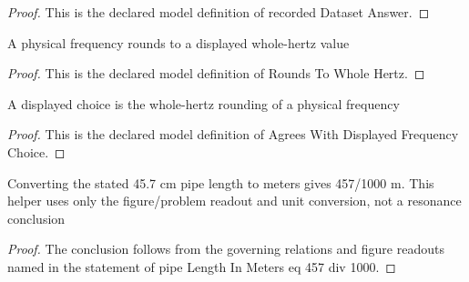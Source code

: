 \begin{proof}
  This is the declared model definition of recorded Dataset Answer.
\end{proof}
\begin{definition}
  \label{def:physics:phyx-mini-0318:phyxminiproblems-problemphyxmini0318-roundstowholehertz}
  A physical frequency rounds to a displayed whole-hertz value
\end{definition}
\begin{proof}
  This is the declared model definition of Rounds To Whole Hertz.
\end{proof}
\begin{definition}
  \label{def:physics:phyx-mini-0318:phyxminiproblems-problemphyxmini0318-agreeswithdisplayedfrequencychoice}
  A displayed choice is the whole-hertz rounding of a physical frequency
\end{definition}
\begin{proof}
  This is the declared model definition of Agrees With Displayed Frequency Choice.
\end{proof}
\begin{lemma}
  \label{lem:physics:phyx-mini-0318:phyxminiproblems-problemphyxmini0318-pipelengthinmeters-eq-457-div-1000}
  Converting the stated 45.7 cm pipe length to meters gives 457/1000 m. This helper uses only the figure/problem readout and unit conversion, not a resonance conclusion
\end{lemma}
\begin{proof}
  The conclusion follows from the governing relations and figure readouts named in the statement of pipe Length In Meters eq 457 div 1000.
\end{proof}
